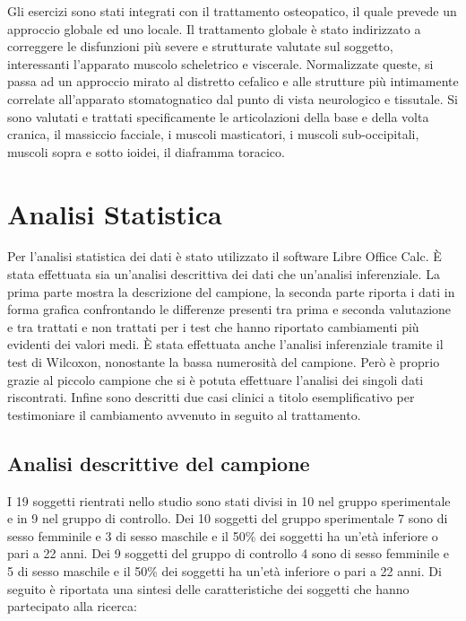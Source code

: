 Gli esercizi sono stati integrati con il trattamento osteopatico, il quale prevede un approccio globale ed uno locale. Il trattamento globale è stato indirizzato a correggere le disfunzioni più severe e strutturate valutate sul soggetto, interessanti l’apparato muscolo scheletrico e viscerale. Normalizzate queste, si passa ad un approccio mirato al distretto cefalico e alle strutture più intimamente correlate all’apparato stomatognatico dal punto di vista neurologico e tissutale. Si sono valutati e trattati specificamente le articolazioni della base e della volta cranica, il massiccio facciale, i muscoli masticatori, i muscoli sub-occipitali, muscoli sopra e sotto ioidei, il diaframma toracico.



\section{Analisi Statistica}

Per l’analisi statistica dei dati è stato utilizzato il software Libre Office Calc. È stata effettuata sia un’analisi descrittiva dei dati che un’analisi inferenziale. La prima parte mostra la descrizione del campione, la seconda parte riporta i dati in forma grafica confrontando le differenze presenti tra prima e seconda valutazione e tra trattati e non trattati per i test che hanno riportato cambiamenti più evidenti dei valori medi. È stata effettuata anche l’analisi inferenziale tramite il test di Wilcoxon, nonostante la bassa numerosità del campione. Però è proprio grazie al piccolo campione che si è potuta effettuare l’analisi dei singoli dati riscontrati. Infine sono descritti due casi clinici a titolo esemplificativo per testimoniare il cambiamento avvenuto in seguito al trattamento.

\subsection{Analisi descrittive del campione}

I 19 soggetti rientrati nello studio sono stati divisi in 10 nel gruppo sperimentale e in 9 nel gruppo di controllo. Dei 10 soggetti del gruppo sperimentale 7 sono di sesso femminile e 3 di sesso maschile e il 50\% dei soggetti ha un’età inferiore o pari a 22 anni. Dei 9 soggetti del gruppo di controllo 4 sono di sesso femminile e 5 di sesso maschile e il 50\% dei soggetti ha un’età inferiore o pari a 22 anni. Di seguito è riportata una sintesi delle caratteristiche dei soggetti che hanno partecipato alla ricerca:

